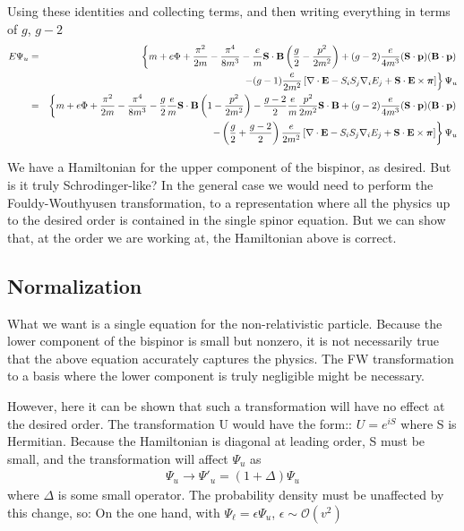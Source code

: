 Using these identities and collecting terms, and then writing everything in terms of $g$, $g-2$
\begin{eqnarray*}
	E \Psi_u 
		&=&\left\{ m + e\Phi + \frac{\pi^2}{2m} - \frac{\pi^4 } {8m^3}
			- \frac{e}{m} \mathbf{S} \cdot \mathbf{B} \left ( \frac{g}{2} - \frac{p^2}{2m^2} \right )
			+ (g-2)\frac{e}{4m^3} (\mathbf{S} \cdot \mathbf{p}) (\mathbf{B} \cdot \mathbf{p})	\right. \\
		&&	\left.
			- (g-1)\frac{e}{2m^2} 
				\left [ 
					\mathbf{\nabla} \cdot \mathbf{E} 
					- S_i S_j \nabla_i E_j +\mathbf{S} \cdot \mathbf{E} \times \mbox{\boldmath$ \pi $}
				\right ]
			\right\}\Psi_u	\\
		&=& \left\{ m + e\Phi + \frac{\pi^2}{2m} - \frac{\pi^4 } {8m^3}
			- \frac{g}{2}\frac{e}{m} \mathbf{S} \cdot \mathbf{B} \left ( 1 - \frac{p^2}{2m^2} \right )
			- \frac{g-2}{2} \frac{e}{m} \frac{p^2}{2m^2} \mathbf{S} \cdot \mathbf{B} 
			+ (g-2)\frac{e}{4m^3} (\mathbf{S} \cdot \mathbf{p}) (\mathbf{B} \cdot \mathbf{p})	\right.	\\
		&&	\left.
			- \left ( \frac{g}{2} + \frac{g-2}{2} \right) \frac{e}{2m^2} 
				\left [ 
					\mathbf{\nabla} \cdot \mathbf{E} 
					- S_i S_j \nabla_i E_j +\mathbf{S} \cdot \mathbf{E} \times \mbox{\boldmath$ \pi $}
				\right ]
			\right\}\Psi_u
\end{eqnarray*}
			
We have a Hamiltonian for the upper component of the bispinor, as desired.  But is it truly Schrodinger-like?  In the general case we would need to perform the Fouldy-Wouthyusen transformation, to a representation where all the physics up to the desired order is contained in the single spinor equation.  But we can show that, at the order we are working at, the Hamiltonian above is correct.



\subsection{Normalization}
What we want is a single equation for the non-relativistic particle.  Because the lower component of the bispinor is small but nonzero, it is not necessarily true that the above equation accurately captures the physics.  The FW transformation to a basis where the lower component is truly negligible might be necessary.

However, here it can be shown that such a transformation will have no effect at the desired order.  The transformation U would have the form::
 $U = e^{iS} $ where S is Hermitian.  Because the Hamiltonian is diagonal at leading order, S must be small, and the transformation will affect $\Psi_u$ as
\begin{eqnarray*} 
\Psi_u \to \Psi'_u= (1 + \Delta)\Psi_u 
\end{eqnarray*}
where $\Delta$ is some small operator.  The probability density must be unaffected by this change, so:
On the one hand, with $\Psi_\ell = \epsilon \Psi_u$, $ \epsilon \sim \mathcal{O}(v^2) $

